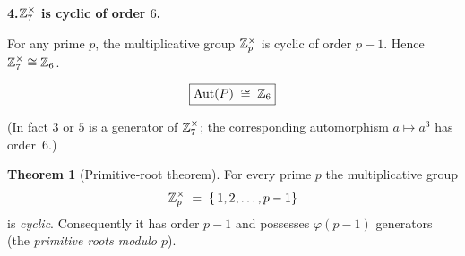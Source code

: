\documentclass[12pt]{article}
\DeclareMathOperator{\Aut}{Aut}
\theoremstyle{definition} %
\newtheorem{theorem}{Theorem}
\theoremstyle{plain} %
\begin{document}
\smallskip
\textbf{4.\;$\Bbb Z_{7}^{\times}$ is cyclic of order $6$.}

For any prime \(p\), the multiplicative group
\(
      \Bbb Z_{p}^{\times}
\)
is cyclic of order \(p-1\).
Hence \(\Bbb Z_{7}^{\times}\cong\Bbb Z_{6}\).

\[
      \boxed{\Aut(P)\;\cong\;\Bbb Z_{6}}
\]

\noindent
(In fact \(3\) or \(5\) is a generator of \(\Bbb Z_{7}^{\times}\); the
corresponding automorphism \(a\mapsto a^{3}\) has order~\(6\).)
\begin{theorem}[Primitive‐root theorem]
  For every prime\/ $p$ the multiplicative group
  \[
        \Bbb Z_{p}^{\times}
        \;=\;
        \{\,1,2,\dots ,p-1\}
  \]
  is \emph{cyclic}.  Consequently it has order $p-1$ and possesses
  $\varphi(p-1)$ generators (the \emph{primitive roots modulo $p$}).
  \end{theorem}
  
\end{document}
